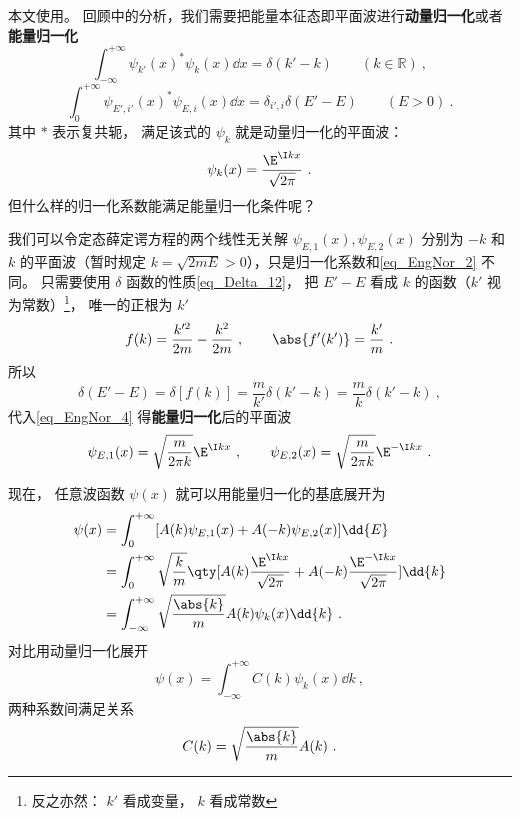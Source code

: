 

本文使用。 回顾中的分析，我们需要把能量本征态即平面波进行\textbf{动量归一化}或者\textbf{能量归一化}%
\begin{equation}\label{eq_EngNor_1}
\int_{-\infty}^{+\infty} \psi_{k'}(x)^* \psi_{k}(x) \dd{x} = \delta(k' - k) \qquad (k \in \mathbb R)~,
\end{equation}
\begin{equation}\label{eq_EngNor_4}
\int_{0}^{+\infty} \psi_{E',i'}(x)^* \psi_{E,i}(x) \dd{x} = \delta_{i',i}\delta(E' - E) \qquad (E > 0)~.
\end{equation}
其中 $*$ 表示复共轭， 满足该式的 $\psi_k$ 就是动量归一化的平面波：%
\begin{equation}\label{eq_EngNor_2}
\psi_k(x) = \frac{\E^{\I kx}}{\sqrt{2\pi}}~.
\end{equation}
但什么样的归一化系数能满足能量归一化条件呢？

我们可以令定态薛定谔方程的两个线性无关解 $\psi_{E,1}(x), \psi_{E,2}(x)$ 分别为 $-k$ 和 $k$ 的平面波（暂时规定 $k = \sqrt{2mE} > 0$），只是归一化系数和\autoref{eq_EngNor_2} 不同。 只需要使用 $\delta$ 函数的性质\autoref{eq_Delta_12}， 把 $E'-E$ 看成 $k$ 的函数（$k'$ 视为常数）\footnote{反之亦然： $k'$ 看成变量， $k$ 看成常数}， 唯一的正根为 $k'$
\begin{equation}
f(k) = \frac{k'^2}{2m} - \frac{k^2}{2m}~,
\qquad
\abs{f'(k')} = \frac{k'}{m}~.
\end{equation}
所以
\begin{equation}
\delta(E'-E) = \delta[f(k)] = \frac{m}{k'} \delta(k'-k) = \frac{m}{k} \delta(k'-k)~,
\end{equation}
代入\autoref{eq_EngNor_4} 得\textbf{能量归一化}后的平面波
\begin{equation}
\psi_{E,1}(x) = \sqrt{\frac{m}{2\pi k}}\E^{\I kx}~,
\qquad
\psi_{E,2}(x) = \sqrt{\frac{m}{2\pi k}}\E^{-\I kx}~.
\end{equation}

现在， 任意波函数 $\psi(x)$ 就可以用能量归一化的基底展开为%
\begin{equation}
\begin{aligned}
\psi(x) &= \int_0^{+\infty} [A(k) \psi_{E,1}(x) + A(-k) \psi_{E,2}(x)] \dd{E}\\
&= \int_0^{+\infty} \sqrt{\frac{k}{m}}\qty[A(k) \frac{\E^{\I kx}}{\sqrt{2\pi}} + A(-k)\frac{\E^{-\I kx}}{\sqrt{2\pi}}]\dd{k}\\
&= \int_{-\infty}^{+\infty} \sqrt{\frac{\abs{k}}{m}}A(k) \psi_k(x) \dd{k}~.
\end{aligned}
\end{equation}
对比用动量归一化展开
\begin{equation}
\psi(x) = \int_{-\infty}^{+\infty} C(k)\psi_k(x) \dd{k}~,
\end{equation}
两种系数间满足关系
\begin{equation}
C(k) = \sqrt{\frac{\abs{k}}{m}}A(k)~.
\end{equation}

